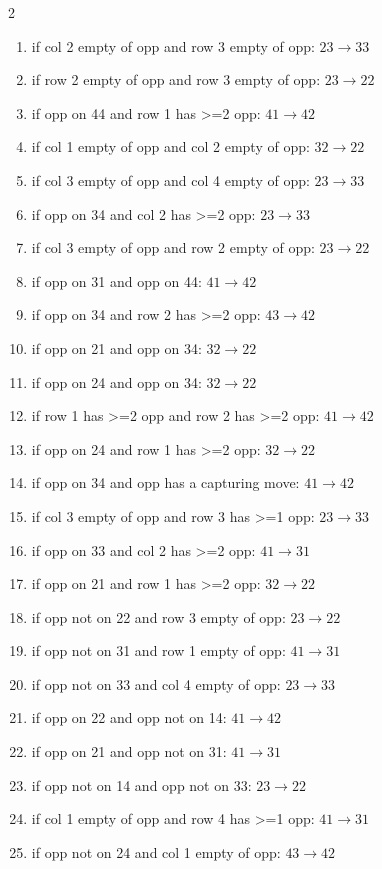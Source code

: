 \begin{multicols}{2}
\begin{tikzpicture}[scale=0.24]
\end{tikzpicture}
\nopagebreak\begin{enumerate}[topsep=1pt,itemsep=0pt,parsep=0pt,leftmargin=2.2em,label=\arabic*.]
\item if col 2 empty of opp and row 3 empty of opp: $23\!\to\!33$
\item if row 2 empty of opp and row 3 empty of opp: $23\!\to\!22$
\item if opp on 44 and row 1 has >=2 opp: $41\!\to\!42$
\item if col 1 empty of opp and col 2 empty of opp: $32\!\to\!22$
\item if col 3 empty of opp and col 4 empty of opp: $23\!\to\!33$
\item if opp on 34 and col 2 has >=2 opp: $23\!\to\!33$
\item if col 3 empty of opp and row 2 empty of opp: $23\!\to\!22$
\item if opp on 31 and opp on 44: $41\!\to\!42$
\item if opp on 34 and row 2 has >=2 opp: $43\!\to\!42$
\item if opp on 21 and opp on 34: $32\!\to\!22$
\item if opp on 24 and opp on 34: $32\!\to\!22$
\item if row 1 has >=2 opp and row 2 has >=2 opp: $41\!\to\!42$
\item if opp on 24 and row 1 has >=2 opp: $32\!\to\!22$
\item if opp on 34 and opp has a capturing move: $41\!\to\!42$
\item if col 3 empty of opp and row 3 has >=1 opp: $23\!\to\!33$
\item if opp on 33 and col 2 has >=2 opp: $41\!\to\!31$
\item if opp on 21 and row 1 has >=2 opp: $32\!\to\!22$
\item if opp not on 22 and row 3 empty of opp: $23\!\to\!22$
\item if opp not on 31 and row 1 empty of opp: $41\!\to\!31$
\item if opp not on 33 and col 4 empty of opp: $23\!\to\!33$
\item if opp on 22 and opp not on 14: $41\!\to\!42$
\item if opp on 21 and opp not on 31: $41\!\to\!31$
\item if opp not on 14 and opp not on 33: $23\!\to\!22$
\item if col 1 empty of opp and row 4 has >=1 opp: $41\!\to\!31$
\item if opp not on 24 and col 1 empty of opp: $43\!\to\!42$

\end{enumerate}
\end{multicols}
